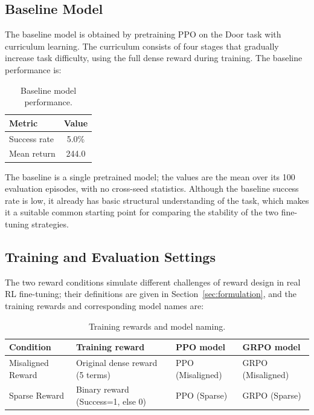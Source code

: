 \subsection{Baseline Model}

The baseline model is obtained by pretraining PPO on the Door task with curriculum learning. The curriculum consists of four stages that gradually increase task difficulty, using the full dense reward during training. The baseline performance is:

\begin{table}[h]
\centering
\begin{tabular}{lc}
\hline
Metric & Value \\
\hline
Success rate & 5.0\% \\
Mean return & 244.0 \\
\hline
\end{tabular}
\caption{Baseline model performance.}
\label{tab:baseline}
\end{table}

The baseline is a single pretrained model; the values are the mean over its 100 evaluation episodes, with no cross-seed statistics. Although the baseline success rate is low, it already has basic structural understanding of the task, which makes it a suitable common starting point for comparing the stability of the two fine-tuning strategies.

\subsection{Training and Evaluation Settings}

The two reward conditions simulate different challenges of reward design in real RL fine-tuning; their definitions are given in Section~\ref{sec:formulation}, and the training rewards and corresponding model names are:

\begin{table}[h]
\centering
\begin{tabular}{llll}
\hline
Condition & Training reward & PPO model & GRPO model \\
\hline
Misaligned Reward & Original dense reward (5 terms) & PPO (Misaligned) & GRPO (Misaligned) \\
Sparse Reward & Binary reward (Success=1, else 0) & PPO (Sparse) & GRPO (Sparse) \\
\hline
\end{tabular}
\caption{Training rewards and model naming.}
\label{tab:conditions}
\end{table}

